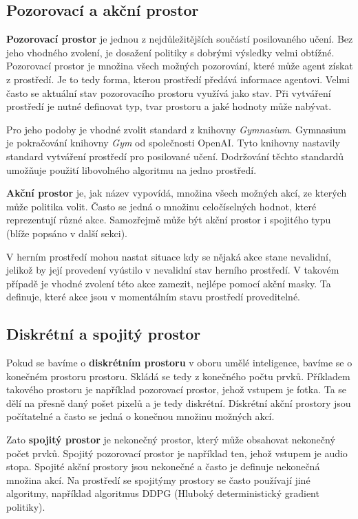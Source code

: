 \subsection{Pozorovací a akční prostor}
\label{subsec:prostory}

\textbf{Pozorovací prostor} je jednou z nejdůležitějších součástí posilovaného učení.
Bez jeho vhodného zvolení, je dosažení politiky s dobrými výsledky velmi obtížné.
Pozorovací prostor je množina všech možných pozorování, které může agent získat z prostředí.
Je to tedy forma, kterou prostředí předává informace agentovi.
Velmi často se aktuální stav pozorovacího prostoru využívá jako stav.
Při vytváření prostředí je nutné definovat typ, tvar prostoru a jaké hodnoty může nabývat.

Pro jeho podoby je vhodné zvolit standard z knihovny \emph{Gymnasium}\cite{Gymnasium}.
Gymnasium je pokračování knihovny \textit{Gym} od společnosti OpenAI.
Tyto knihovny nastavily standard vytváření prostředí pro posilované učení.
Dodržování těchto standardů umožňuje použití libovolného algoritmu na jedno prostředí.

\bigskip

\textbf{Akční prostor} je, jak název vypovídá, množina všech možných akcí, ze kterých může politika volit.
Často se jedná o množinu celočíselných hodnot, které reprezentují různé akce.
Samozřejmě může být akční prostor i spojitého typu (blíže popsáno v další sekci).

V herním prostředí mohou nastat situace kdy se nějaká akce stane nevalidní, jelikož by její provedení vyústilo v nevalidní stav herního prostředí.
V takovém případě je vhodné zvolení této akce zamezit, nejlépe pomocí akční masky.
Ta definuje, které akce jsou v momentálním stavu prostředí proveditelné.

\subsection{Diskrétní a spojitý prostor}\label{subsec:diskretni-a-spojity-prostor}

Pokud se bavíme o \textbf{diskrétním prostoru} v oboru umělé inteligence, bavíme se o konečném prostoru prostoru. 
Skládá se tedy z konečného počtu prvků.
Příkladem takového prostoru je například pozorovací prostor, jehož vstupem je fotka.
Ta se dělí na přesně daný pošet pixelů a je tedy diskrétní.
Dískrétní akční prostory jsou počítatelné a často se jedná o konečnou množinu možných akcí.

Zato \textbf{spojitý prostor} je nekonečný prostor, který může obsahovat nekonečný počet prvků. 
Spojitý pozorovací prostor je například ten, jehož vstupem je audio stopa.
Spojité akční prostory jsou nekonečné a často je definuje nekonečná množina akcí.
Na prostředí se spojitýmy prostory se často používají jiné algoritmy, například algoritmus DDPG (Hluboký deterministický gradient politiky).

